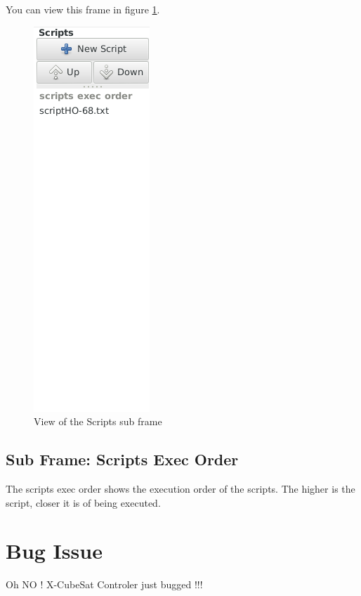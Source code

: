 \documentclass[pdftex,11pt,a4paper,titlepage]{report}
\begin{document}
You can view this frame in figure \ref{ScriptsFrame}.
\begin{figure}[h]
\centering
\includegraphics[scale=0.6]{../images/ScriptsFrame.png}
\caption{View of the Scripts sub frame}
\label{ScriptsFrame}
\end{figure}
\section{Sub Frame: Scripts Exec Order}
The scripts exec order shows the execution order of the scripts. The higher is the script, closer it is of being executed.

\chapter{Bug Issue}
\begin{framed}
Oh NO ! X-CubeSat Controler just bugged !!!
\end{framed} 
\end{document}
